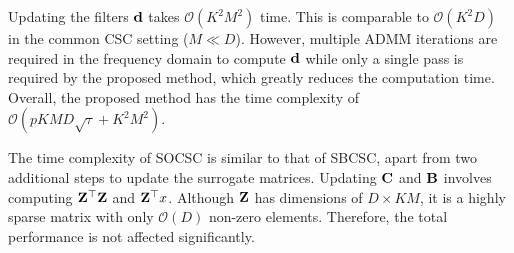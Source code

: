 Updating the filters $\filter$ takes $\mathcal{O}(K^2M^2)$ time. This
is comparable to $\mathcal{O}(K^2D)$ in the common CSC setting ($M \ll
D$). However, multiple ADMM iterations are required in the frequency
domain to compute $\filter$ while only a single pass is required by
the proposed method, which greatly reduces the computation
time. Overall, the proposed method has the time complexity of
$\mathcal{O}(pKMD \sqrt{\tau} + K^2M^2)$.

The time complexity of SOCSC is similar to that of SBCSC, apart from
two additional steps to update the surrogate matrices. Updating
$\surC$ and $\surB$ involves computing $\Code^\top\Code$ and
$\Code^\top x$. Although $\Code$ has dimensions of $D \times KM$, it
is a highly sparse matrix with only $\mathcal{O}(D)$ non-zero
elements. Therefore, the total performance is not affected
significantly.



